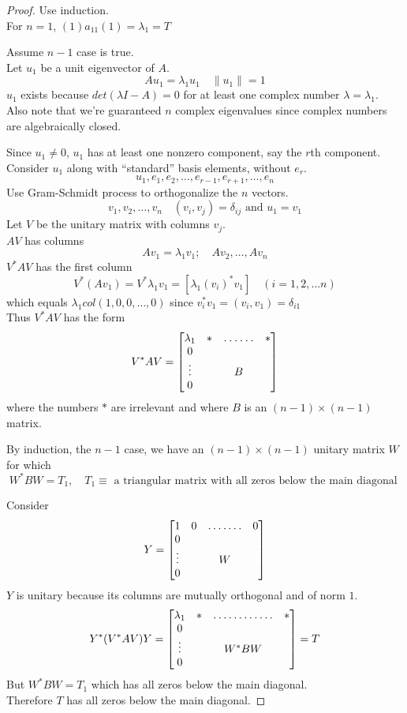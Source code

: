 \documentclass[twoside]{amsart}
\theoremstyle{plain}
\theoremstyle{definition}
\begin{document}
\begin{proof}
Use induction.  \\
For $n=1$, $(1)a_{11}(1) = \lambda_1 = T $

Assume $n-1$ case is true.  \\
\quad Let $u_1$ be a unit eigenvector of $A$.  
\[
A u_1 = \lambda_1 u_1 \quad \| u_1 \| = 1
\]
$u_1$ exists because $det(\lambda I -A) =0$ for at least one complex number $\lambda = \lambda_1$.  \\
Also note that we're guaranteed $n$ complex eigenvalues since complex numbers are algebraically closed.  

Since $u_1 \neq 0$, $u_1$ has at least one nonzero component, say the $r$th component.  \\
Consider $u_1$ along with ``standard'' basis elements, without $e_r$.  
\[
u_1, e_1, e_2, \dots , e_{r-1}, e_{r+1}, \dots , e_n
\]
Use Gram-Schmidt process to orthogonalize the $n$ vectors.  
\[
v_1, v_2, \dots , v_n \quad (v_i, v_j) = \delta_{ij} \text{ and } u_1 = v_1
\]
Let $V$ be the unitary matrix with columns $v_j$. \\  
\phantom{Let} $AV$ has columns 
\[
Av_1 = \lambda_1 v_1; \quad Av_2, \dots , Av_n
\]
$V^* AV$ has the first column
\[
V^* (Av_1) = V^* \lambda_1 v_1 = [ \lambda_1 (v_i)^* v_1 ] \quad (i = 1,2, \dots n) 
\]
which equals $\lambda_1 col(1,0,0, \dots, 0)$ since $v_i^* v_1 = (v_i, v_1) = \delta_{i1} $ \\
Thus $V^* A V$ has the form
\[
V^* AV = \left[ 
  \begin{matrix}
    \lambda_1 & * & \hdotsfor{3} & * \\
    0  \\
    \vdots & & & B & \\
    0  \\
  \end{matrix}
\right]
\]
where the numbers $*$ are irrelevant and where $B$ is an $(n-1) \times (n-1)$ matrix.  

By induction, the $n-1$ case, we have an $(n-1) \times (n-1)$ unitary matrix $W$ for which 
\[
W^* BW = T_1, \quad T_1 \equiv \text{ a triangular matrix with all zeros below the main diagonal }
\]

Consider 
\[
Y = \left[ 
  \begin{matrix}
    1 & 0 & \hdotsfor{3} & 0 \\
    0 \\
    \vdots & & & W & \\
    0 \\
    \end{matrix}
\right]
\]
$Y$ is unitary because its columns are mutually orthogonal and of norm $1$.
\[
Y^* (V^* A V)Y = \left[ 
  \begin{matrix}
    \lambda_1 & * & \hdotsfor{3} & * \\
    0  \\
    \vdots & & & W^* B W & \\
    0  \\
  \end{matrix}
  \right] = T
\]
But $W^* BW = T_1$ which has all zeros below the main diagonal.  \\
\phantom{But}Therefore $T$ has all zeros below the main diagonal. 


\end{proof}
\end{document}
